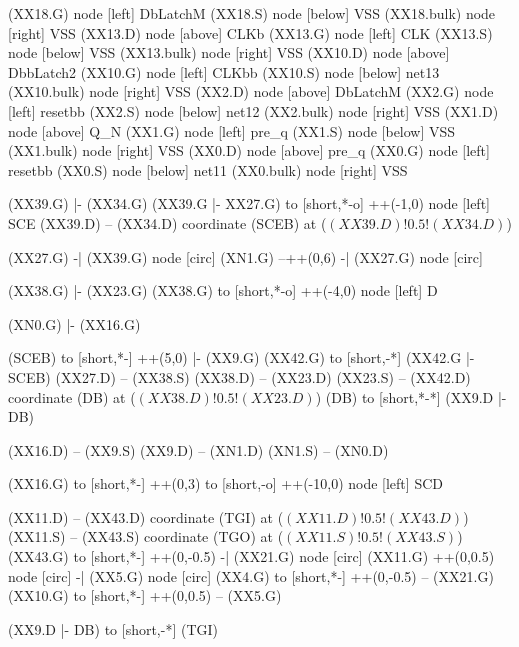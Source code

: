 \begin{circuitikz}[american]
	(XX18.G) node [left]	{DbLatchM}
	(XX18.S) node [below]	{VSS}
	(XX18.bulk) node [right]	{VSS}
	(XX13.D) node [above]	{CLKb}
	(XX13.G) node [left]	{CLK}
	(XX13.S) node [below]	{VSS}
	(XX13.bulk) node [right]	{VSS}
	(XX10.D) node [above]	{DbbLatch2}
	(XX10.G) node [left]	{CLKbb}
	(XX10.S) node [below]	{net13}
	(XX10.bulk) node [right]	{VSS}
	(XX2.D) node [above]	{DbLatchM}
	(XX2.G) node [left]	{resetbb}
	(XX2.S) node [below]	{net12}
	(XX2.bulk) node [right]	{VSS}
	(XX1.D) node [above]	{Q\_N}
	(XX1.G) node [left]	{pre\_q}
	(XX1.S) node [below]	{VSS}
	(XX1.bulk) node [right]	{VSS}
	(XX0.D) node [above]	{pre\_q}
	(XX0.G) node [left]	{resetbb}
	(XX0.S) node [below]	{net11}
	(XX0.bulk) node [right]	{VSS}
\fi


	(XX39.G) |- (XX34.G)
	(XX39.G |- XX27.G) to [short,*-o] ++(-1,0) node [left] {SCE}
	(XX39.D) -- (XX34.D)
	coordinate (SCEB) at ($(XX39.D)!0.5!(XX34.D)$)

	(XX27.G) -| (XX39.G) node [circ] {}
	(XN1.G) --++(0,6) -| (XX27.G) node [circ] {}
	
	(XX38.G) |- (XX23.G) 
	(XX38.G) to [short,*-o] ++(-4,0) node [left] {D}
	
	(XN0.G) |- (XX16.G) 
	

	(SCEB) to [short,*-] ++(5,0) |- (XX9.G)
	(XX42.G) to [short,-*] (XX42.G |- SCEB) 
	(XX27.D) -- (XX38.S)
	(XX38.D) -- (XX23.D)
	(XX23.S) -- (XX42.D)
	coordinate (DB) at ($(XX38.D)!0.5!(XX23.D)$)
	(DB) to [short,*-*] (XX9.D |- DB)

	(XX16.D) -- (XX9.S)
	(XX9.D) -- (XN1.D)
	(XN1.S) -- (XN0.D)

	(XX16.G) to [short,*-] ++(0,3) to [short,-o] ++(-10,0) node [left] {SCD}
		
	(XX11.D) -- (XX43.D)
	coordinate (TGI) at ($(XX11.D)!0.5!(XX43.D)$)
	(XX11.S) -- (XX43.S)
	coordinate (TGO) at ($(XX11.S)!0.5!(XX43.S)$)
	(XX43.G) to [short,*-] ++(0,-0.5) -| (XX21.G) node [circ] {}
	(XX11.G) ++(0,0.5) node [circ] {} -| (XX5.G) node [circ] {}
	(XX4.G) to [short,*-] ++(0,-0.5) -- (XX21.G)
	(XX10.G) to [short,*-] ++(0,0.5) -- (XX5.G)
	
	(XX9.D |- DB) to [short,-*] (TGI)
	

\end{circuitikz}
